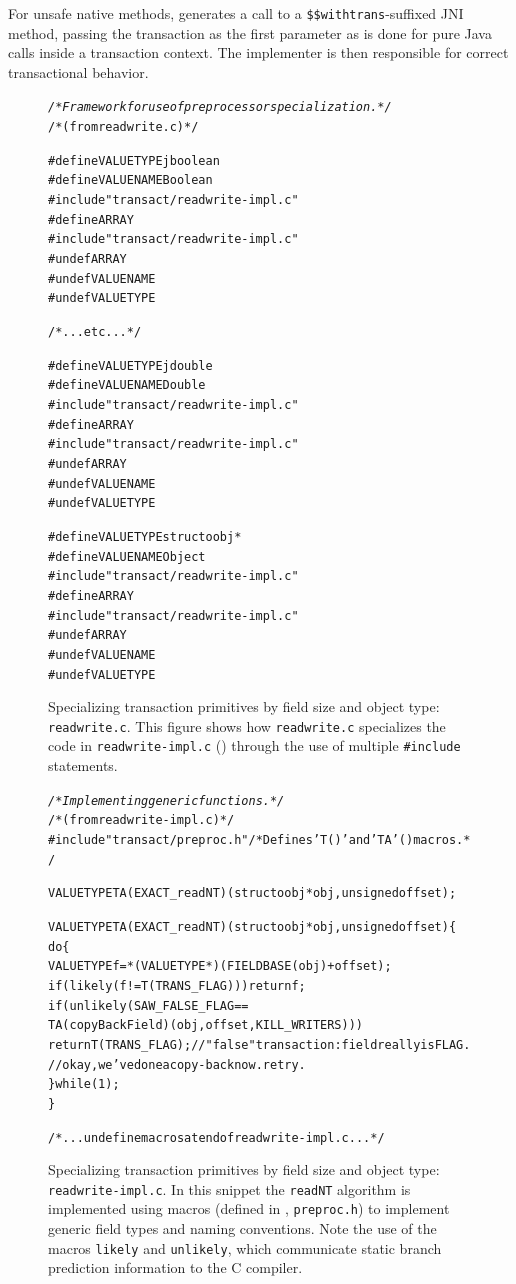 For unsafe native methods, \flex generates a call to a
\texttt{\$\$withtrans}-suffixed JNI method, passing the transaction as
the first parameter as is done for pure Java calls inside a
transaction context.  The implementer is then responsible for correct
transactional behavior.

\begin{figure}\sis\fontsize{8}{9}\begin{alltt}
\textit{/* Framework for use of preprocessor specialization. */}
/* (from readwrite.c) */

#define VALUETYPE jboolean
#define VALUENAME Boolean
#include "transact/readwrite-impl.c"
#define ARRAY
#include "transact/readwrite-impl.c"
#undef ARRAY
#undef VALUENAME
#undef VALUETYPE

/* ... etc ... */

#define VALUETYPE jdouble
#define VALUENAME Double
#include "transact/readwrite-impl.c"
#define ARRAY
#include "transact/readwrite-impl.c"
#undef ARRAY
#undef VALUENAME
#undef VALUETYPE

#define VALUETYPE struct oobj *
#define VALUENAME Object
#include "transact/readwrite-impl.c"
#define ARRAY
#include "transact/readwrite-impl.c"
#undef ARRAY
#undef VALUENAME
#undef VALUETYPE
\end{alltt}
\caption[Specializing transaction primitives by field size and object
  type (\texttt{readwrite.c}).]{
Specializing transaction primitives by field size and object type:
  \texttt{readwrite.c}.
This figure shows how \texttt{readwrite.c} specializes the code in
\texttt{readwrite-impl.c} () through the use of multiple 
\texttt{\#include} statements.}
\label{fig:special1}
\end{figure}
\begin{figure}\sis\fontsize{8}{9}\begin{alltt}
\textit{/* Implementing generic functions. */}
/* (from readwrite-impl.c) */
#include "transact/preproc.h" /* Defines 'T()' and 'TA'() macros. */

VALUETYPE TA(EXACT_readNT)(struct oobj *obj, unsigned offset);

VALUETYPE TA(EXACT_readNT)(struct oobj *obj, unsigned offset) \{
  do \{
    VALUETYPE f = *(VALUETYPE*)(FIELDBASE(obj) + offset);
    if (likely(f!=T(TRANS_FLAG))) return f;
    if (unlikely(SAW_FALSE_FLAG ==
                 TA(copyBackField)(obj, offset, KILL_WRITERS)))
      return T(TRANS_FLAG); // "false" transaction: field really is FLAG.
    // okay, we've done a copy-back now.  retry.
  \} while(1);
\}

/* ... undefine macros at end of readwrite-impl.c ... */\end{alltt}
\caption[Specializing transaction primitives by field size and object
 type (\texttt{readwrite-impl.c}).]{
Specializing transaction primitives by field size and object type:
 \texttt{readwrite-impl.c}.  In this snippet the \texttt{readNT} algorithm is
 implemented using macros (defined in ,
 \texttt{preproc.h}) to implement generic field types and naming
 conventions.  Note the use of the macros \texttt{likely} and
 \texttt{unlikely}, which communicate static branch
 prediction information to the C compiler.}
\label{fig:special2}
\end{figure}
